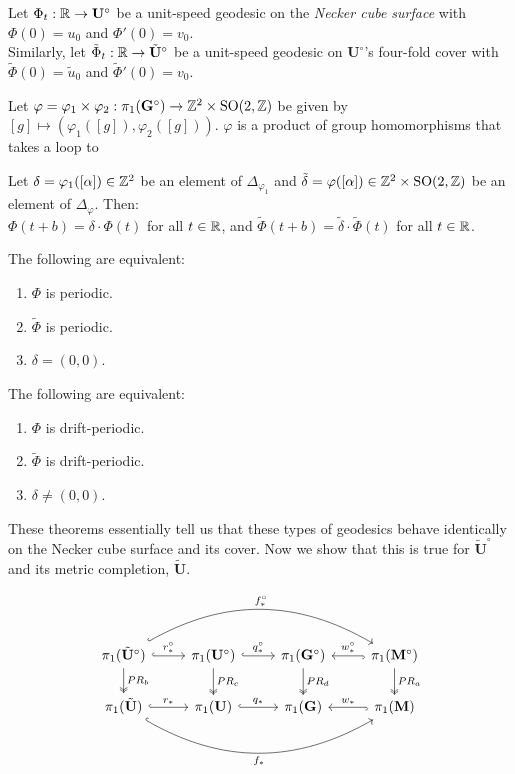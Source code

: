 \documentclass[]{article}
\def\bU{\mathbf{U}} \def\btU{\tilde{\bU}} \def\bUs{\bU^\circ}
\def\bG{\mathbf{G}} \def\bGs{\mathbf{G}^\circ}
\def\bM{\mathbf{M}}
\def\bMs{\mathbf{M}^\circ}
\def\btUs{\btU^\circ}
\def\utild{\tilde{u}_0}
\def\phitild{\tilde{\Phi}}
\def\SO{\mathrm{SO}}
\begin{document}
\begin{Def}
Let $\Phi_t:\RR\rightarrow\bUs$ be a unit-speed geodesic on the \emph{Necker cube surface} with $\Phi(0)=u_0$ and $\Phi'(0)=v_0$. \\Similarly, let $\tilde{\Phi}_t:\RR\rightarrow\btUs$ be a unit-speed geodesic on $\bUs$'s four-fold cover with $\phitild(0)=\utild$ and $\phitild'(0)=v_0$.
\end{Def}
Let $\varphi=\varphi_1\times\varphi_2:\pi_1(\bGs)\rightarrow \ZZ^2\times\SO(2,\ZZ)$ be given by $[g]\mapsto(\varphi_1([g]),\varphi_2([g]))$. $\varphi$ is a
product of group homomorphisms that takes a loop to 
\begin{thm}
Let $\delta=\varphi_1([\alpha])\in\mathbb{Z}^2$ be an element of $\Delta_{\varphi_1}$ and $\tilde{\delta}=\varphi([\alpha])\in\ZZ^2\times \SO(2,\ZZ)$ be an element of $\Delta_{\varphi}$. Then:\\
$\Phi(t+b)=\delta\cdot\Phi(t)$ for all $t\in\mathbb{R}$, and 
$\phitild(t+b)=\tilde{\delta}\cdot\phitild(t)$ for all $t\in\mathbb{R}$.
\end{thm}

\begin{cor}
The following are equivalent:
\begin{enumerate}
\item $\Phi$ is periodic.
\item $\phitild$ is periodic.
\item $\delta=(0,0)$.
\end{enumerate}
\end{cor}

\begin{cor}
The following are equivalent:
\begin{enumerate}
\item $\Phi$ is drift-periodic.
\item $\phitild$ is drift-periodic.
\item $\delta\neq(0,0)$.
\end{enumerate}
\end{cor}

These theorems essentially tell us that these types of geodesics behave identically on the Necker cube surface and its cover. Now we show that this is true for $\btUs$ and its metric completion, $\btU$.

\begin{equation}
\begin{tikzcd}
\arrow[hookrightarrow, bend left]{rrr}{f_*^\circ}[swap]{} \arrow[two heads]{d}{PR_b} \pi_1(\btUs) \arrow[hook]{r}{r_*^\circ} & \pi_1(\bUs) \arrow[two heads]{d}{PR_c} \arrow[hook]{r}{q_*^\circ} & \pi_1(\bGs) \arrow[two heads]{d}{PR_d} & \ar[hookrightarrow]{l}{}[swap]{w_*^\circ} \pi_1(\bMs) \arrow[two heads]{d}{PR_a} \\
\arrow[hookrightarrow, bend right]{rrr}{}[swap]{f_*}  \pi_1(\btU) \arrow[hook]{r}{r_*} & \pi_1(\bU) \arrow[hook]{r}{q_*} & \pi_1(\bG) & \ar[hookrightarrow]{l}{}[swap]{w_*} \pi_1(\bM)\\
\end{tikzcd}
\label{eq:homomorphism}
\end{equation}
\end{document}

